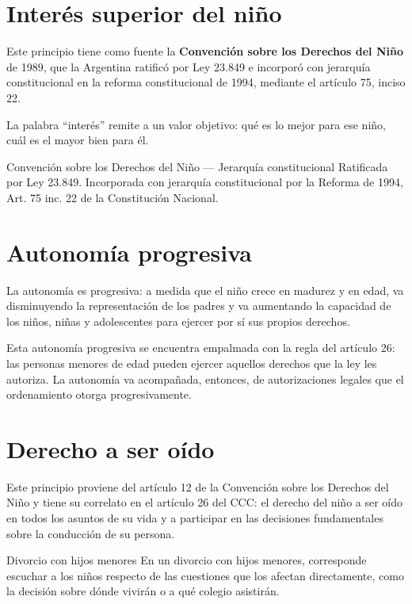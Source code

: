 \documentclass[12pt,oneside]{book}
\begin{document}
\section{Interés superior del niño}

Este principio tiene como fuente la \textbf{Convención sobre los Derechos del Niño} de 1989, que la Argentina ratificó por Ley 23.849 e incorporó con jerarquía constitucional en la reforma constitucional de 1994, mediante el artículo 75, inciso 22.

La palabra \textquotedblleft interés\textquotedblright{} remite a un valor objetivo: qué es lo mejor para ese niño, cuál es el mayor bien para él.

\begin{definition}{Convención sobre los Derechos del Niño — Jerarquía constitucional}
Ratificada por Ley 23.849. Incorporada con jerarquía constitucional por la Reforma de 1994, Art. 75 inc. 22 de la Constitución Nacional.
\end{definition}

\section{Autonomía progresiva}

La autonomía es progresiva: a medida que el niño crece en madurez y en edad, va disminuyendo la representación de los padres y va aumentando la capacidad de los niños, niñas y adolescentes para ejercer por sí sus propios derechos.

Esta autonomía progresiva se encuentra empalmada con la regla del artículo 26: las personas menores de edad pueden ejercer aquellos derechos que la ley les autoriza. La autonomía va acompañada, entonces, de autorizaciones legales que el ordenamiento otorga progresivamente.

\section{Derecho a ser oído}

Este principio proviene del artículo 12 de la Convención sobre los Derechos del Niño y tiene su correlato en el artículo 26 del CCC: el derecho del niño a ser oído en todos los asuntos de su vida y a participar en las decisiones fundamentales sobre la conducción de su persona.

\begin{example}{Divorcio con hijos menores}
En un divorcio con hijos menores, corresponde escuchar a los niños respecto de las cuestiones que los afectan directamente, como la decisión sobre dónde vivirán o a qué colegio asistirán.
\end{example}
\end{document}
